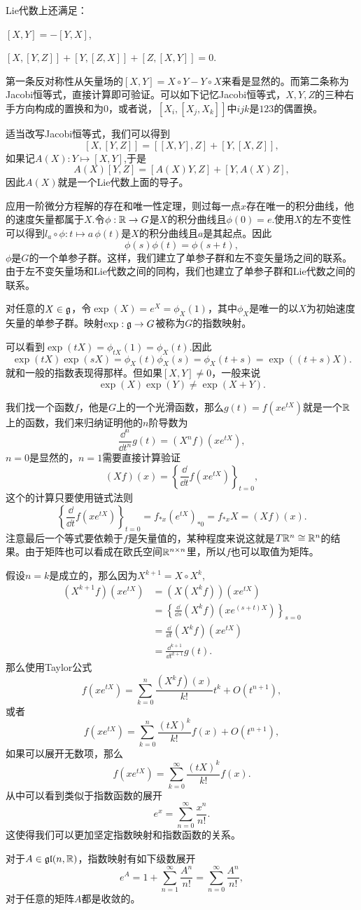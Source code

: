 \pro Lie代数上还满足：

 $[X,Y]=-[Y,X]$,

 $[X,[Y,Z]]+[Y,[Z,X]]+[Z,[X,Y]]=0$.

第一条反对称性从矢量场的$[X,Y]=X\circ Y-Y\circ X$来看是显然的。而第二条称为Jacobi恒等式，直接计算即可验证。可以如下记忆Jacobi恒等式，$X,Y,Z$的三种右手方向构成的置换和为$0$，或者说，$[X_i,[X_j,X_k]]$中$ijk$是$123$的偶置换。

适当改写Jacobi恒等式，我们可以得到
\[
[X,[Y,Z]]=[[X,Y],Z]+[Y,[X,Z]],
\]
如果记$A(X):Y\mapsto [X,Y]$,于是
\[
A(X)[Y,Z]=[A(X)Y,Z]+[Y,A(X)Z],
\]
因此$A(X)$就是一个Lie代数上面的导子。

应用一阶微分方程解的存在和唯一性定理，则过每一点$x$存在唯一的积分曲线，他的速度矢量都属于$X$.令$\phi:\mathbb{R}\to G$是$X$的积分曲线且$\phi(0)=e$.使用$X$的左不变性可以得到$l_a\circ \phi:t\mapsto a\,\phi(t)$是$X$的积分曲线且$a$是其起点。因此
\[
\phi(s)\phi(t)=\phi(s+t),
\]
$\phi$是$G$的一个单参子群。这样，我们建立了单参子群和左不变矢量场之间的联系。由于左不变矢量场和Lie代数之间的同构，我们也建立了单参子群和Lie代数之间的联系。


\para
对任意的$X\in {\mathfrak{g}}$，令$\exp(X)=e^X=\phi_X(1)$，其中$\phi_X$是唯一的以$X$为初始速度矢量的单参子群。映射$\exp:{\mathfrak{g}}\to G$被称为$G$的指数映射。

可以看到$\exp(tX)=\phi_{tX}(1)=\phi_{X}(t)$.因此
\[
\exp(tX)\exp(sX)=\phi_{X}(t)\phi_{X}(s)=\phi_{X}(t+s)=\exp((t+s)X).
\]
就和一般的指数表现得那样。但如果$[X,Y]\neq 0$，一般来说\[
\exp(X)\exp(Y)\neq \exp(X+Y).
\]

我们找一个函数$f$，他是$G$上的一个光滑函数，那么$g(t)=f(xe^{tX})$就是一个$\mathbb{R}$上的函数，我们来归纳证明他的$n$阶导数为
\[
	\frac{\dd^n}{\dd t^n}g(t)=(X^nf)(x e^{tX}),
\]
$n=0$是显然的，$n=1$需要直接计算验证
\[
	(Xf)(x)=\left\{\frac{\dd}{\dd t}f(x e^{tX})\right\}_{t=0},
\]
这个的计算只要使用链式法则
\[
	\left\{\frac{\dd}{\dd t}f(x e^{tX})\right\}_{t=0}=f_{*x}(e^{tX})_{*0}=f_{*x}X=(Xf)(x).
\]
注意最后一个等式要依赖于$f$是矢量值的，某种程度来说这就是$T\mathbb{R}^n\cong \mathbb{R}^n$的结果。由于矩阵也可以看成在欧氏空间$\mathbb{R}^{n\times n}$里，所以$f$也可以取值为矩阵。


假设$n=k$是成立的，那么因为$X^{k+1}=X\circ X^k$,
\[
	\begin{split}
	(X^{k+1}f)(x e^{tX})&=(X(X^{k}f))(x e^{tX})\\
	&=\left\{\frac{\dd}{\dd s}(X^kf)(x e^{(s+t)X})\right\}_{s=0}\\
	&=\frac{\dd}{\dd t}(X^kf)(x e^{tX})\\
	&=\frac{\dd^{k+1}}{\dd t^{k+1}}g(t).
	\end{split}
\]
那么使用Taylor公式
\[
	f(xe^{tX})=\sum_{k=0}^n\frac{(X^{k}f)(x)}{k!}t^k+O(t^{n+1}),
\]
或者
\[
	f(xe^{tX})=\sum_{k=0}^n\frac{(tX)^{k}}{k!}f(x)+O(t^{n+1}),
\]
如果可以展开无数项，那么
\[
	f(xe^{tX})=\sum_{k=0}^\infty\frac{(tX)^{k}}{k!}f(x).
\]
从中可以看到类似于指数函数的展开
\[
	e^x=\sum_{n=0}^\infty \frac{x^n}{n!}.
\]
这使得我们可以更加坚定指数映射和指数函数的关系。
\begin{theo}
对于$A\in\mathfrak{gl}(n,\mathbb{R})$，指数映射有如下级数展开
\[
	e^A=1+\sum_{n=1}^\infty \frac{A^n}{n!}=\sum_{n=0}^\infty \frac{A^n}{n!},
\]
对于任意的矩阵$A$都是收敛的。
\end{theo}

